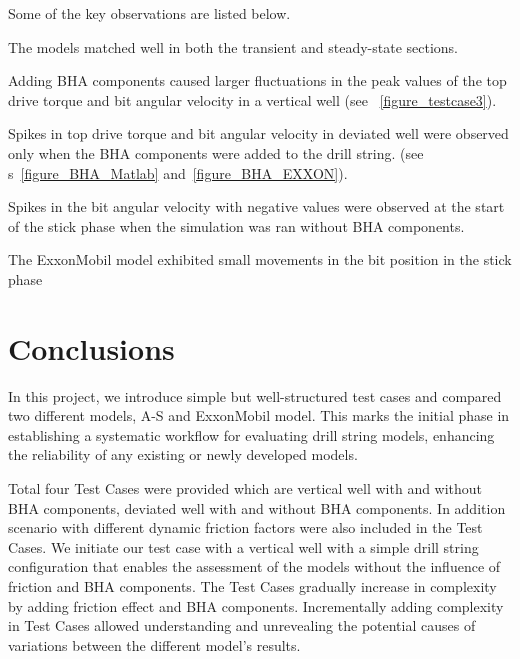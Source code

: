 Some of the key observations are listed below.
\begin{bulletedlist}
    \item The models matched well in both the transient and steady-state sections.
    \item Adding BHA components caused larger fluctuations in the peak values of the top drive torque and bit angular velocity in a vertical well (see \figurename~\ref{figure_testcase3}).
    \item Spikes in top drive torque and bit angular velocity in deviated well were observed only when the BHA components were added to the drill string. (see \figurename{}s~\ref{figure_BHA_Matlab} and~\ref{figure_BHA_EXXON}). \resolvedcomment{}
    \item Spikes in the bit angular velocity with negative values were observed at the start of the stick phase when the simulation was ran without BHA components. \resolvedcomment{}
    \item The ExxonMobil model exhibited small movements in the bit position in the stick phase
    \item 
\end{bulletedlist}

\section{Conclusions}
In this project, we introduce simple but well-structured test cases and compared two different models, A-S and ExxonMobil model. This marks the initial phase in establishing a systematic workflow for evaluating drill string models, enhancing the reliability of any existing or newly developed models. 

Total four Test Cases were provided which are vertical well with and without BHA components, deviated well with and without BHA components. In addition scenario with different dynamic friction factors were also included in the Test Cases. We initiate our test case with a vertical well with a simple drill string configuration that enables the assessment of the models without the influence of friction and BHA components. The Test Cases gradually increase in complexity by adding friction effect and BHA components. Incrementally adding complexity in Test Cases allowed understanding and unrevealing the potential causes of variations between the different model's results. 

